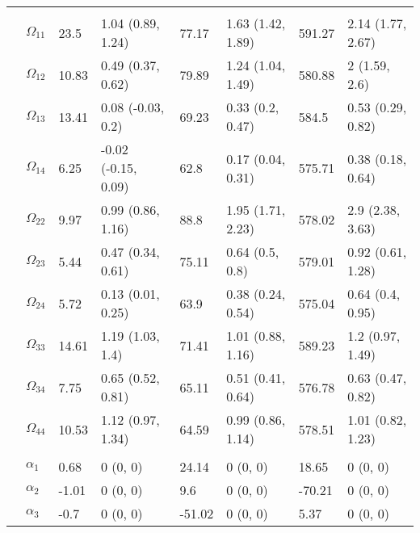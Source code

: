 \documentclass[]{article}
\begin{document}
\begin{table}[t]
\begin{tabular}{llllllll}
\addlinespace[0.3em]
\multicolumn{8}{l}{\textbf{ }}\\
\hspace{1em} & $\Omega_{11}$ & 23.5 & 1.04 (0.89, 1.24) & 77.17 & 1.63 (1.42, 1.89) & 591.27 & 2.14 (1.77, 2.67)\\
\hspace{1em} & $\Omega_{12}$ & 10.83 & 0.49 (0.37, 0.62) & 79.89 & 1.24 (1.04, 1.49) & 580.88 & 2 (1.59, 2.6)\\
\hspace{1em} & $\Omega_{13}$ & 13.41 & 0.08 (-0.03, 0.2) & 69.23 & 0.33 (0.2, 0.47) & 584.5 & 0.53 (0.29, 0.82)\\
\hspace{1em} & $\Omega_{14}$ & 6.25 & -0.02 (-0.15, 0.09) & 62.8 & 0.17 (0.04, 0.31) & 575.71 & 0.38 (0.18, 0.64)\\
\hspace{1em} & $\Omega_{22}$ & 9.97 & 0.99 (0.86, 1.16) & 88.8 & 1.95 (1.71, 2.23) & 578.02 & 2.9 (2.38, 3.63)\\
\hspace{1em} & $\Omega_{23}$ & 5.44 & 0.47 (0.34, 0.61) & 75.11 & 0.64 (0.5, 0.8) & 579.01 & 0.92 (0.61, 1.28)\\
\hspace{1em} & $\Omega_{24}$ & 5.72 & 0.13 (0.01, 0.25) & 63.9 & 0.38 (0.24, 0.54) & 575.04 & 0.64 (0.4, 0.95)\\
\hspace{1em} & $\Omega_{33}$ & 14.61 & 1.19 (1.03, 1.4) & 71.41 & 1.01 (0.88, 1.16) & 589.23 & 1.2 (0.97, 1.49)\\
\hspace{1em} & $\Omega_{34}$ & 7.75 & 0.65 (0.52, 0.81) & 65.11 & 0.51 (0.41, 0.64) & 576.78 & 0.63 (0.47, 0.82)\\
\hspace{1em} & $\Omega_{44}$ & 10.53 & 1.12 (0.97, 1.34) & 64.59 & 0.99 (0.86, 1.14) & 578.51 & 1.01 (0.82, 1.23)\\
\addlinespace[0.3em]
\multicolumn{8}{l}{\textbf{ }}\\
\hspace{1em} & $\alpha_{1}$ & 0.68 & 0 (0, 0) & 24.14 & 0 (0, 0) & 18.65 & 0 (0, 0)\\
\hspace{1em} & $\alpha_{2}$ & -1.01 & 0 (0, 0) & 9.6 & 0 (0, 0) & -70.21 & 0 (0, 0)\\
\hspace{1em} & $\alpha_{3}$ & -0.7 & 0 (0, 0) & -51.02 & 0 (0, 0) & 5.37 & 0 (0, 0)\\

\end{tabular}
\end{table}
\end{document}
